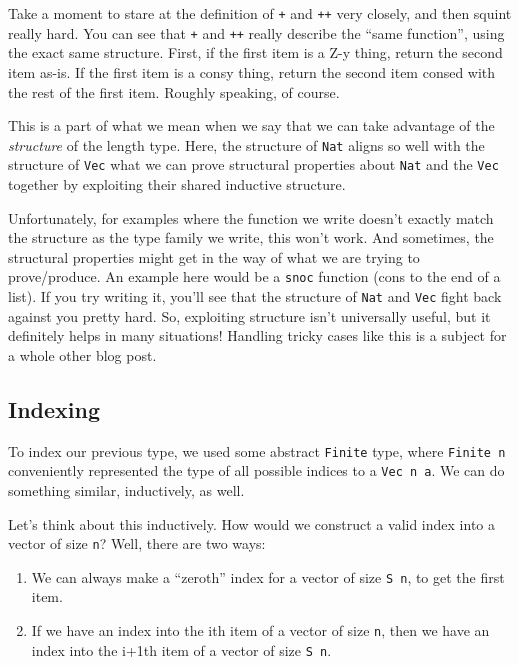 \documentclass[]{article}
\begin{document}
Take a moment to stare at the definition of \texttt{+} and \texttt{++} very
closely, and then squint really hard. You can see that \texttt{+} and
\texttt{++} really describe the ``same function'', using the exact same
structure. First, if the first item is a Z-y thing, return the second item
as-is. If the first item is a consy thing, return the second item consed with
the rest of the first item. Roughly speaking, of course.

This is a part of what we mean when we say that we can take advantage of the
\emph{structure} of the length type. Here, the structure of \texttt{Nat} aligns
so well with the structure of \texttt{Vec} what we can prove structural
properties about \texttt{Nat} and the \texttt{Vec} together by exploiting their
shared inductive structure.

Unfortunately, for examples where the function we write doesn't exactly match
the structure as the type family we write, this won't work. And sometimes, the
structural properties might get in the way of what we are trying to
prove/produce. An example here would be a \texttt{snoc} function (cons to the
end of a list). If you try writing it, you'll see that the structure of
\texttt{Nat} and \texttt{Vec} fight back against you pretty hard. So, exploiting
structure isn't universally useful, but it definitely helps in many situations!
Handling tricky cases like this is a subject for a whole other blog post.

\hypertarget{indexing-1}{%
\subsection{Indexing}\label{indexing-1}}

To index our previous type, we used some abstract \texttt{Finite} type, where
\texttt{Finite\ n} conveniently represented the type of all possible indices to
a \texttt{Vec\ n\ a}. We can do something similar, inductively, as well.

Let's think about this inductively. How would we construct a valid index into a
vector of size \texttt{n}? Well, there are two ways:

\begin{enumerate}
\def\labelenumi{\arabic{enumi}.}
\tightlist
\item
  We can always make a ``zeroth'' index for a vector of size
  \texttt{\textquotesingle{}S\ n}, to get the first item.
\item
  If we have an index into the ith item of a vector of size \texttt{n}, then we
  have an index into the i+1th item of a vector of size
  \texttt{\textquotesingle{}S\ n}.
\end{enumerate}
\end{document}
